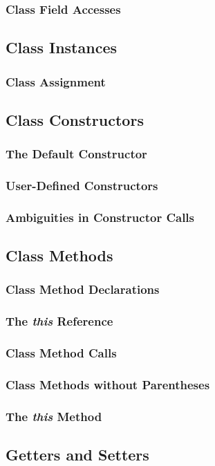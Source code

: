 \documentclass[10pt,twoside,titlepage]{article}
\begin{document}
\subsubsection{Class Field Accesses}
\subsection{Class Instances}
\subsubsection{Class Assignment}
\subsection{Class Constructors}
\subsubsection{The Default Constructor}
\subsubsection{User-Defined Constructors}
\subsubsection{Ambiguities in Constructor Calls}
\subsection{Class Methods}
\subsubsection{Class Method Declarations}
\subsubsection{The {\em this} Reference}
\subsubsection{Class Method Calls}
\subsubsection{Class Methods without Parentheses}
\subsubsection{The {\em this} Method}
\subsection{Getters and Setters}
\end{document}
